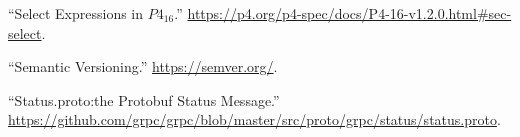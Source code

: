 \documentclass[11pt]{article}
\begin{document}
{{\begin{thebibliography}{39}
\mdbibitemlabel{{}[26]}\textquotedblleft{}Select Expressions in $P4_{16}$.\textquotedblright{} \href{https://p4.org/p4-spec/docs/P4-16-v1.2.0.html\%23sec-select}{{\ttfamily https://\hspace{0pt}p4.\hspace{0pt}org/\hspace{0pt}p4-\hspace{0pt}spec/\hspace{0pt}docs/\hspace{0pt}P4-\hspace{0pt}16-\hspace{0pt}v1.\hspace{0pt}2.\hspace{0pt}0.\hspace{0pt}html\#\hspace{0pt}sec-\hspace{0pt}select}}.\label{p4selectexpr}%

\mdbibitemlabel{{}[27]}\textquotedblleft{}Semantic Versioning.\textquotedblright{} \href{https://semver.org/}{{\ttfamily https://\hspace{0pt}semver.\hspace{0pt}org/\hspace{0pt}}}.\label{semver}%

\mdbibitemlabel{{}[28]}\textquotedblleft{}Status.proto:the Protobuf Status Message.\textquotedblright{} \href{https://github.com/grpc/grpc/blob/master/src/proto/grpc/status/status.proto}{{\ttfamily https://\hspace{0pt}github.\hspace{0pt}com/\hspace{0pt}grpc/\hspace{0pt}grpc/\hspace{0pt}blob/\hspace{0pt}master/\hspace{0pt}src/\hspace{0pt}proto/\hspace{0pt}grpc/\hspace{0pt}status/\hspace{0pt}status.\hspace{0pt}proto}}.\label{protostatus}%


\end{thebibliography}}}
\end{document}
